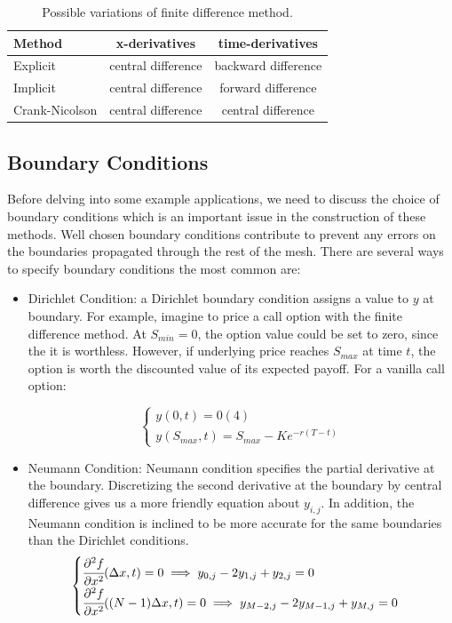 \begin{table}[htb]
    \centering
    \begin{tabular}{|l|c|c|}
    \hline
    Method & x-derivatives & time-derivatives \\
    \hline
    Explicit & central difference & backward difference \\
    \hline
    Implicit & central difference & forward difference \\
    \hline
    Crank-Nicolson & central difference & central difference \\
    \hline
    \end{tabular}
\caption{Possible variations of finite difference method.}
\label{tab:various_methods}
\end{table}

\subsection{Boundary Conditions}
Before delving into some example applications, we need to discuss the choice of boundary conditions which is an important issue in the construction of these methods. Well chosen boundary conditions contribute to prevent any errors on the boundaries propagated through the rest of the mesh. There are several ways to specify boundary conditions the most common are:

\begin{itemize}
\item Dirichlet Condition: a Dirichlet boundary condition assigns a value to $y$ at boundary. For example, imagine to price a call option with the finite difference method. At $S_{min}=0$, the option value could be set to zero, since the it is worthless. However, if underlying price reaches $S_{max}$ at time $t$, the option is worth the discounted value of its expected payoff. For a vanilla call option:

\begin{equation*}
\begin{cases}
y(0,t)=0(4)\\
y(S_{max},t)=S_{max}-Ke^{-r(T-t)}
\end{cases}
\end{equation*}
\item Neumann Condition: Neumann condition specifies the partial derivative at the boundary. Discretizing the second derivative at the boundary by central difference gives us a more friendly equation about $y_{i,j}$. In addition, the Neumann condition is inclined to be more accurate for the same boundaries than the Dirichlet conditions.
\begin{equation*}
\begin{cases}
\cfrac{\partial^2 f}{\partial x^2}(\Delta x,t)=0 \implies y_{0,j}-2y_{1,j}+y_{2,j}=0\\[1ex]
\cfrac{\partial^2 f}{\partial x^2}((N-1)\Delta x,t) =0\implies y_{M-2,j}-2y_{M-1,j}+y_{M,j}=0
\end{cases}
\end{equation*}
\end{itemize}

